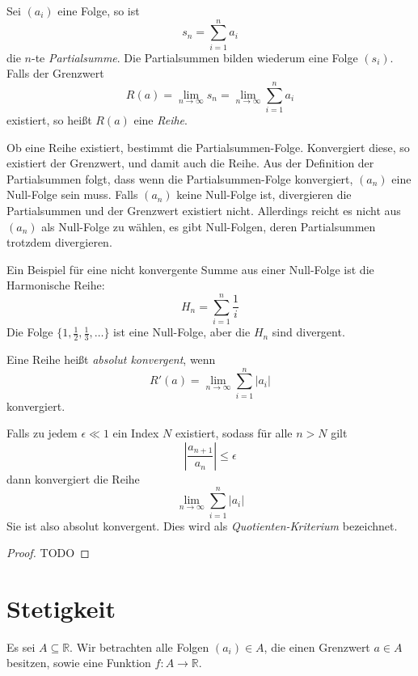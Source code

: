 \begin{definition}
Sei $(a_i)$ eine Folge, so ist 
\[
s_n = \sum_{i=1}^{n} a_i
\]
die $n$-te \emph{Partialsumme}. Die Partialsummen bilden wiederum eine Folge $(s_i)$. Falls der Grenzwert 
\[
R(a) = \lim_{n\rightarrow \infty} s_n = \lim_{n\rightarrow \infty} \sum_{i=1}^{n} a_i
\]
existiert, so heißt $R(a)$ eine \emph{Reihe}.
\end{definition}

Ob eine Reihe existiert, bestimmt die Partialsummen-Folge. Konvergiert diese, so existiert der Grenzwert, und damit auch die Reihe. Aus der Definition der Partialsummen folgt, dass wenn die Partialsummen-Folge konvergiert, $(a_n)$ eine Null-Folge sein muss. Falls $(a_n)$ keine Null-Folge ist, divergieren die Partialsummen und der Grenzwert  existiert nicht. Allerdings reicht es nicht aus $(a_n)$ als Null-Folge zu wählen, es gibt Null-Folgen, deren Partialsummen trotzdem divergieren. 

Ein Beispiel für eine nicht konvergente Summe aus einer Null-Folge ist die Harmonische Reihe:
\[
H_n = \sum_{i=1}^{n} \frac{1}{i}
\]
Die Folge $\lbrace 1, \frac{1}{2}, \frac{1}{3}, \dots \rbrace$ ist eine Null-Folge, aber die $H_n$ sind divergent.

\begin{definition}
Eine Reihe heißt \emph{absolut konvergent}, wenn 
\[
R'(a) = \lim_{n\rightarrow \infty} \sum_{i=1}^{n} \vert a_i \vert
\]
konvergiert.
\end{definition}

\begin{lemma}
Falls zu jedem $\epsilon \ll 1$ ein Index $N$ existiert, sodass für alle $n>N$ gilt
\[
\left\vert \frac{a_{n+1}}{a_n} \right\vert \le \epsilon
\]
dann konvergiert die Reihe 
\[
\lim\limits_{n\rightarrow \infty} \sum_{i=1}^{n} \vert a_i \vert
\]
Sie ist also absolut konvergent. Dies wird als \emph{Quotienten-Kriterium} bezeichnet.
\end{lemma}
\begin{proof}
TODO
\end{proof}


\section{Stetigkeit}

Es sei $A\subseteq \mathbb{R}$. Wir betrachten alle Folgen $(a_i)\in A$, die einen Grenzwert $a\in A$ besitzen, sowie eine Funktion $f: A\longrightarrow \mathbb{R}$. 

